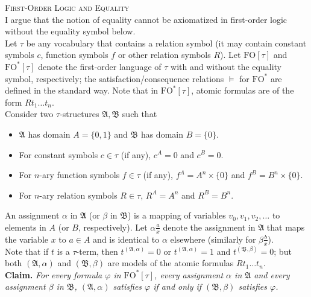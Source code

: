 \documentclass[11pt, leqno]{report}
\newcommand{\etc}{\ldots} %
\newcommand{\sete}[1]{{\{#1\}}} %
\newcommand{\cart}{\mathop{\times}} %
\newcommand{\cartpwr}[2]{#1^{#2}} %
\newcommand{\strct}[1]{\mathfrak{#1}} %
\newcommand{\intpr}[2]{#1^{#2}} %
\newcommand{\fo}{\mathrm{FO}} %
\newcommand{\foe}{\fo^\ast}
\newcommand{\sbst}[2]{{\scriptstyle\frac{\displaystyle #1}{\displaystyle #2}}} %
\newcommand{\satis}{\models} %
\theoremstyle{remark}
\theoremstyle{note}
\begin{document}
\noindent\textsc{\large First-Order Logic and Equality\bigskip\\}
I argue that the notion of equality cannot be axiomatized in first-order logic without the equality symbol below.
\medskip\\
Let $\tau$ be any vocabulary that contains a relation symbol (it may contain constant symbols $c$, function symbols $f$ or other relation symbols $R$). Let $\fo[\tau]$ and $\foe[\tau]$ denote the first-order language of $\tau$ with and without the equality symbol, respectively; the satisfaction/consequence relations $\satis$ for $\foe$ are defined in the standard way. Note that in $\foe[\tau]$, atomic formulas are of the form $Rt_1 \etc t_n$.
\medskip\\
Consider two $\tau$-structures $\strct{A}, \strct{B}$ such that
\begin{itemize}
%
\item $\strct{A}$ has domain $A = \sete{0, 1}$ and $\strct{B}$ has domain $B = \sete{0}$.
%
\item For constant symbols $c \in \tau$ (if any), $\intpr{c}{A} = 0$ and $\intpr{c}{B} = 0$.
%
\item For $n$-ary function symbols $f \in \tau$ (if any), $\intpr{f}{A} = \cartpwr{A}{n} \cart \sete{0}$ and $\intpr{f}{B} = \cartpwr{B}{n} \cart \sete{0}$.
%
\item For $n$-ary relation symbols $R \in \tau$, $\intpr{R}{A} = \cartpwr{A}{n}$ and $\intpr{R}{B} = \cartpwr{B}{n}$.
%
\end{itemize}
An assignment $\alpha$ in $\strct{A}$ (or $\beta$ in $\strct{B}$) is a mapping of variables $v_0, v_1, v_2, \etc$ to elements in $A$ (or $B$, respectively). Let $\alpha\sbst{a}{x}$ denote the assignment in $\strct{A}$ that maps the variable $x$ to $a \in A$ and is identical to $\alpha$ elsewhere (similarly for $\beta\sbst{b}{x}$).
\medskip\\
Note that if $t$ is a $\tau$-term, then $\intpr{t}{(\strct{A}, \alpha)} = 0$ or $\intpr{t}{(\strct{A}, \alpha)} = 1$ and $\intpr{t}{(\strct{B}, \beta)} = 0$; but both $(\strct{A}, \alpha)$ and $(\strct{B}, \beta)$ are models of the atomic formulas $Rt_1 \etc t_n$.
\bigskip\\
\textbf{Claim.} \emph{For every formula $\varphi$ in $\foe[\tau]$, every assignment $\alpha$ in $\strct{A}$ and every assignment $\beta$ in $\strct{B}$, $(\strct{A}, \alpha)$ satisfies $\varphi$ if and only if $(\strct{B}, \beta)$ satisfies $\varphi$.}
\end{document}
